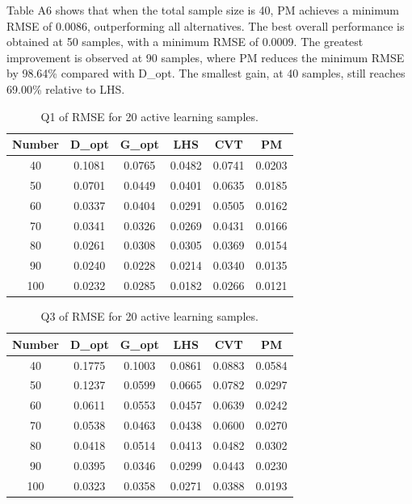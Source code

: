 \documentclass[]{interact}
\theoremstyle{plain}%
\theoremstyle{definition}
\theoremstyle{remark}
\begin{document}
Table A6 shows that when the total sample size is 40, PM achieves a minimum RMSE of 0.0086, outperforming all alternatives. The best overall performance is obtained at 50 samples, with a minimum RMSE of 0.0009. The greatest improvement is observed at 90 samples, where PM reduces the minimum RMSE by 98.64\% compared with D\_opt. The smallest gain, at 40 samples, still reaches 69.00\% relative to LHS.

\begin{table}[h!]
	\centering
	\caption{Q1 of RMSE for 20 active learning samples.}
	\begin{tabular}{cccccc}
		\toprule
		Number & D\_opt & G\_opt & LHS & CVT & PM \\
		\midrule
		40 & 0.1081 & 0.0765 & 0.0482 & 0.0741 & 0.0203 \\
		50 & 0.0701 & 0.0449 & 0.0401 & 0.0635 & 0.0185 \\
		60 & 0.0337 & 0.0404 & 0.0291 & 0.0505 & 0.0162 \\
		70 & 0.0341 & 0.0326 & 0.0269 & 0.0431 & 0.0166 \\
		80 & 0.0261 & 0.0308 & 0.0305 & 0.0369 & 0.0154 \\
		90 & 0.0240 & 0.0228 & 0.0214 & 0.0340 & 0.0135 \\
		100 & 0.0232 & 0.0285 & 0.0182 & 0.0266 & 0.0121 \\
		\bottomrule
	\end{tabular}
\end{table}

\begin{table}[h!]
	\centering
	\caption{Q3 of RMSE for 20 active learning samples.}
	\begin{tabular}{cccccc}
		\toprule
		Number & D\_opt & G\_opt & LHS & CVT & PM \\
		\midrule
		40 & 0.1775 & 0.1003 & 0.0861 & 0.0883 & 0.0584 \\
		50 & 0.1237 & 0.0599 & 0.0665 & 0.0782 & 0.0297 \\
		60 & 0.0611 & 0.0553 & 0.0457 & 0.0639 & 0.0242 \\
		70 & 0.0538 & 0.0463 & 0.0438 & 0.0600 & 0.0270 \\
		80 & 0.0418 & 0.0514 & 0.0413 & 0.0482 & 0.0302 \\
		90 & 0.0395 & 0.0346 & 0.0299 & 0.0443 & 0.0230 \\
		100 & 0.0323 & 0.0358 & 0.0271 & 0.0388 & 0.0193 \\
		\bottomrule
	\end{tabular}
\end{table}
\end{document}
